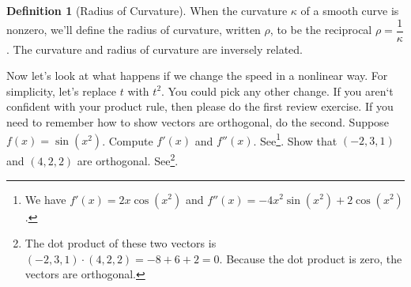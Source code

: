 \documentclass[10pt,]{book}
\theoremstyle{plain}
\theoremstyle{definition}
\newtheorem{definition}[theorem]{Definition}
\theoremstyle{definition}
\theoremstyle{definition}
\theoremstyle{definition}
\theoremstyle{definition}
\numberwithin{equation}{section}
\begin{document}
\begin{definition}[{Radius of Curvature}]\label{definition-27}
When the curvature \(\kappa\) of a smooth curve is nonzero, we'll define the radius of curvature, written \(\rho\), to be the reciprocal \(\rho = \dfrac{1}{\kappa}\). The curvature and radius of curvature are inversely related.%
\end{definition}
Now let's look at what happens if we change the speed in a nonlinear way. For simplicity, let's replace \(t\) with \(t^2\). You could pick any other change. If you aren`t confident with your product rule, then please do the first review exercise. If you need to remember how to show vectors are orthogonal, do the second.%
Suppose \(f(x) = \sin(x^2)\). Compute \(f'(x)\) and \(f''(x)\). See\footnote{We have \(f'(x) = 2x\cos(x^2)\) and \(f''(x) = -4x^2\sin(x^2)+2\cos(x^2)\).\label{fn-11}}.%
Show that \((-2,3,1)\) and \((4,2,2)\) are orthogonal. See\footnote{The dot product of these two vectors is \((-2,3,1)\cdot(4,2,2) = -8+6+2=0\). Because the dot product is zero, the vectors are orthogonal.\label{fn-12}}.%
\end{document}
